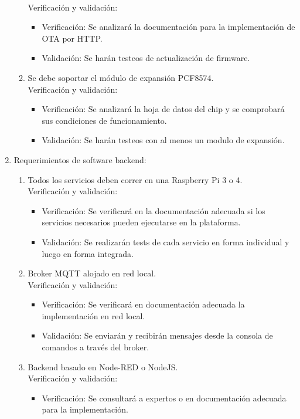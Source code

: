 \documentclass[11pt]{charter}
\begin{document}
\begin{enumerate}
\begin{enumerate}
		\\Verificación y validación:
		\begin{itemize}
		\item Verificación: Se analizará la documentación para la implementación de OTA por HTTP.
		\item Validación: Se harán testeos de actualización de firmware.
		\end{itemize}
	\item Se debe soportar el módulo de expansión PCF8574.
		\\Verificación y validación:
		\begin{itemize}
		\item Verificación: Se analizará la hoja de datos del chip y se comprobará sus condiciones de funcionamiento.
		\item Validación: Se harán testeos con al menos un modulo de expansión.
		\end{itemize}
	\end{enumerate}
\item Requerimientos de software backend:
	\begin{enumerate}
	\item Todos los servicios deben correr en una Raspberry Pi 3 o 4.
		\\Verificación y validación:
		\begin{itemize}
		\item Verificación: Se verificará en la documentación adecuada si los servicios necesarios pueden ejecutarse en la plataforma.
		\item Validación: Se realizarán tests de cada servicio en forma individual y luego en forma integrada.
		\end{itemize}
	\item Broker MQTT alojado en red local.
		\\Verificación y validación:
		\begin{itemize}
		\item Verificación: Se verificará en documentación adecuada la implementación en red local.
		\item Validación: Se enviarán y recibirán mensajes desde la consola de comandos a través del broker.
		\end{itemize}
	\item Backend basado en Node-RED o NodeJS.
		\\Verificación y validación:
		\begin{itemize}
		\item Verificación: Se consultará a expertos o en documentación adecuada para la implementación.

\end{itemize}
\end{enumerate}
\end{enumerate}
\end{document}
